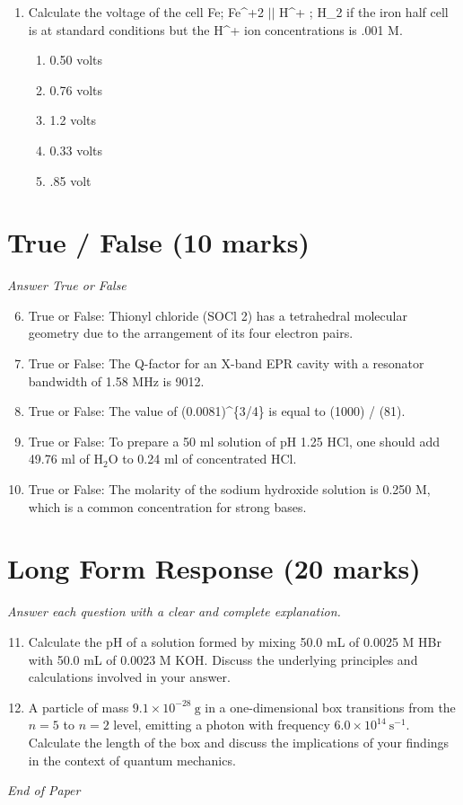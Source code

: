 \documentclass[12pt]{article}
\begin{document}
\begin{enumerate}[label=\arabic*.]
\begin{enumerate}[label=(\alph*)]
    \item The 2 d peak has the lowest energy.
    \item The 1 d peak has the lowest energy.
    \item The 1 p peak has the lowest energy.
\end{enumerate}
\item Calculate the voltage of the cell Fe; Fe^+2 \ensuremath{\vert}\ensuremath{\vert} H^+ ; H\_2 if the iron half cell is at standard conditions but the H^+ ion concentrations is .001 M.
\begin{enumerate}[label=(\alph*)]
    \item 0.50 volts
    \item 0.76 volts
    \item 1.2 volts
    \item 0.33 volts
    \item .85 volt
\end{enumerate}
\end{enumerate}

\section*{True / False (10 marks)}
\textit{Answer True or False}
\begin{enumerate}[label=\arabic*.]
\setcounter{enumi}{5}
\item True or False: Thionyl chloride (SOCl 2) has a tetrahedral molecular geometry due to the arrangement of its four electron pairs.
\item True or False: The Q-factor for an X-band EPR cavity with a resonator bandwidth of 1.58 MHz is 9012.
\item True or False: The value of (0.0081)^\{3/4\} is equal to (1000) / (81).
\item True or False: To prepare a 50 ml solution of pH 1.25 HCl, one should add 49.76 ml of H$_{2}$O to 0.24 ml of concentrated HCl.
\item True or False: The molarity of the sodium hydroxide solution is 0.250 M, which is a common concentration for strong bases.
\end{enumerate}

\section*{Long Form Response (20 marks)}
\textit{Answer each question with a clear and complete explanation.}
\begin{enumerate}[label=\arabic*.]
\setcounter{enumi}{10}
\item Calculate the pH of a solution formed by mixing 50.0 mL of 0.0025 M HBr with 50.0 mL of 0.0023 M KOH. Discuss the underlying principles and calculations involved in your answer.
\item A particle of mass $9.1 \times 10^{-28} \mathrm{~g}$ in a one-dimensional box transitions from the $n=5$ to $n=2$ level, emitting a photon with frequency $6.0 \times 10^{14} \mathrm{~s}^{-1}$. Calculate the length of the box and discuss the implications of your findings in the context of quantum mechanics.
\end{enumerate}

\vfill
\noindent\textit{End of Paper}
\end{document}
